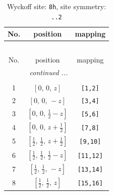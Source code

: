 \documentclass[fleqn,8pt]{jsarticle}
\begin{document}
\begin{longtable}{ccc}
\caption{Wyckoff site: {\tt 8h}, site symmetry: {\tt ..2}}
 \\
 \hline \hline
No. & position & mapping \\ \hline \endfirsthead

\multicolumn{2}{l}{\tablename\ \thetable{}} \\
 \hline \hline
No. & position & mapping \\ \hline \endhead

 \hline \hline
\multicolumn{2}{r}{\footnotesize\it continued ...} \\ \endfoot

 \hline \hline
\multicolumn{2}{r}{} \\ \endlastfoot

1 & $\left[ 0,\, 0,\, z \right]$ & {\tt [1,2]} \\ \hline
2 & $\left[ 0,\, 0,\, - z \right]$ & {\tt [3,4]} \\ \hline
3 & $\left[ 0,\, 0,\, \frac{1}{2} - z \right]$ & {\tt [5,6]} \\ \hline
4 & $\left[ 0,\, 0,\, z + \frac{1}{2} \right]$ & {\tt [7,8]} \\ \hline
5 & $\left[ \frac{1}{2},\, \frac{1}{2},\, z + \frac{1}{2} \right]$ & {\tt [9,10]} \\ \hline
6 & $\left[ \frac{1}{2},\, \frac{1}{2},\, \frac{1}{2} - z \right]$ & {\tt [11,12]} \\ \hline
7 & $\left[ \frac{1}{2},\, \frac{1}{2},\, - z \right]$ & {\tt [13,14]} \\ \hline
8 & $\left[ \frac{1}{2},\, \frac{1}{2},\, z \right]$ & {\tt [15,16]} \\
\end{longtable}
\renewcommand{\arraystretch}{1.2}
\end{document}
